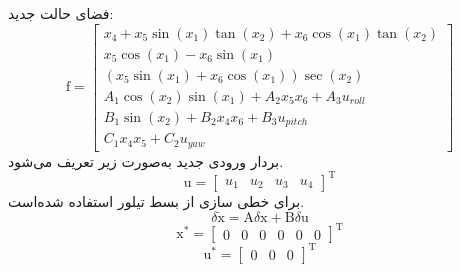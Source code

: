 \documentclass{CCI2020}
\begin{document}
فضای حالت جدید:
\begin{equation}
	\boldsymbol{\mathrm{f}} = \begin{bmatrix}
		x_4 + x_5\sin(x_1)\tan(x_2) + x_6\cos(x_1)\tan(x_2)\\
		x_5\cos(x_1)- x_6\sin(x_1)\\
		(x_5\sin(x_1) + x_6\cos(x_1))\sec(x_2)\\
		A_1\cos(x_2)\sin(x_1) + 
		A_2x_5x_6 + A_3u_{roll}
		\\
		B_1\sin(x_2) + 
		B_2x_4x_6 + B_3u_{pitch}\\
		C_1x_4x_5 + 
		C_2u_{yaw}
	\end{bmatrix}
\end{equation} 
بردار ورودی جدید به‌صورت زیر تعریف می‌شود.
\begin{equation}
	\boldsymbol{\mathrm{u}} = \begin{bmatrix}
		u_1&u_2&u_3&u_4
	\end{bmatrix}^\mathrm{T}
\end{equation}
برای خطی سازی از بسط تیلور استفاده شده‌است.
\begin{equation}
	\delta \dot{\boldsymbol{\mathrm{x}}} = \boldsymbol{\mathrm{A}}\delta \boldsymbol{\mathrm{x}} + \boldsymbol{\mathrm{B}}\delta \boldsymbol{\mathrm{u}}
\end{equation}
\begin{equation}
	\boldsymbol{\mathrm{x}^*} = \begin{bmatrix} %
		0& 0 & 0 & 0& 0& 0
	\end{bmatrix}^\mathrm{T}
\end{equation}
\begin{equation}
	\boldsymbol{\mathrm{u}^*} = \begin{bmatrix}
	0&0&0
	\end{bmatrix}^\mathrm{T}
\end{equation}
\end{document}
